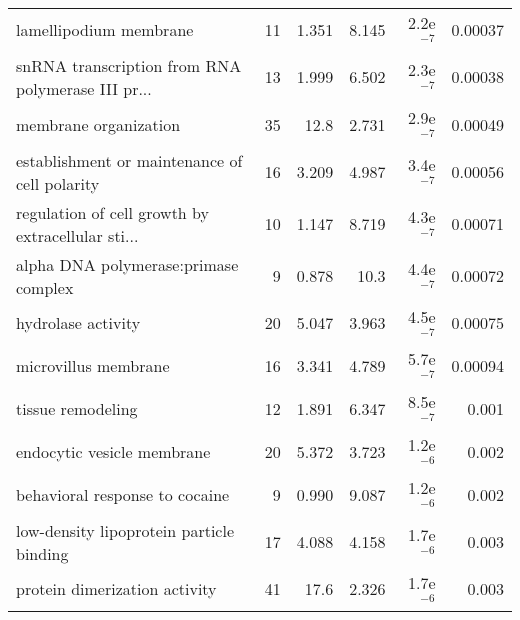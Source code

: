 \begin{longtable}{lrrrrr}
                            lamellipodium membrane &                      11 &                   1.351 &      8.145 &          2.2e$^{-7}$ &              0.00037 \\
 snRNA transcription from RNA polymerase III pr... &                      13 &                   1.999 &      6.502 &          2.3e$^{-7}$ &              0.00038 \\
                             membrane organization &                      35 &                    12.8 &      2.731 &          2.9e$^{-7}$ &              0.00049 \\
     establishment or maintenance of cell polarity &                      16 &                   3.209 &      4.987 &          3.4e$^{-7}$ &              0.00056 \\
 regulation of cell growth by extracellular sti... &                      10 &                   1.147 &      8.719 &          4.3e$^{-7}$ &              0.00071 \\
              alpha DNA polymerase:primase complex &                       9 &                   0.878 &       10.3 &          4.4e$^{-7}$ &              0.00072 \\
                                hydrolase activity &                      20 &                   5.047 &      3.963 &          4.5e$^{-7}$ &              0.00075 \\
                              microvillus membrane &                      16 &                   3.341 &      4.789 &          5.7e$^{-7}$ &              0.00094 \\
                                 tissue remodeling &                      12 &                   1.891 &      6.347 &          8.5e$^{-7}$ &                0.001 \\
                        endocytic vesicle membrane &                      20 &                   5.372 &      3.723 &          1.2e$^{-6}$ &                0.002 \\
                    behavioral response to cocaine &                       9 &                   0.990 &      9.087 &          1.2e$^{-6}$ &                0.002 \\
          low-density lipoprotein particle binding &                      17 &                   4.088 &      4.158 &          1.7e$^{-6}$ &                0.003 \\
                     protein dimerization activity &                      41 &                    17.6 &      2.326 &          1.7e$^{-6}$ &                0.003 \\

\end{longtable}
